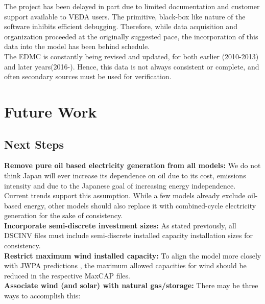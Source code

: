 \documentclass[14pt,a4paper]{article} %
\begin{document}
The project has been delayed in part due to limited documentation and customer support available to VEDA users. The primitive, black-box like nature of the software inhibits efficient debugging. Therefore, while data acquisition and organization proceeded at the originally suggested pace, the incorporation of this data into the model has been behind schedule. \\

The \gls{EDMC} is constantly being revised and updated, for both earlier (2010-2013) and later years(2016-). Hence, this data is not always consistent or complete, and often secondary sources must be used for verification.
\section{Future Work} 

\subsection{Next Steps}

\textbf{Remove pure oil based electricity generation from all models:} We do not think Japan will ever increase its dependence on oil due to its cost, emissions intensity and due to the Japanese goal of increasing energy independence. Current trends support this assumption. While a few models already exclude oil-based energy, other models should also replace it with combined-cycle electricity generation for the sake of consistency.\\

\textbf{Incorporate semi-discrete investment sizes:} As stated previously, all \gls{DSCINV} files must include semi-discrete installed  capacity installation sizes for consistency.\\

\textbf{Restrict maximum wind installed  capacity:} To align the model more closely with JWPA predictions \cite{heger_wind_2016}, the maximum allowed capacities for wind should be reduced in the respective \gls{MaxCAP} files.\\

\textbf{Associate wind (and solar) with natural gas/storage:} There may be three ways to accomplish this:
\end{document}

